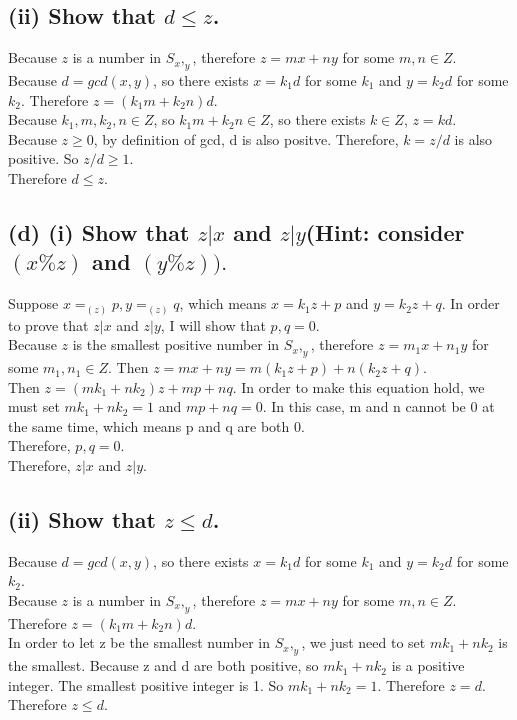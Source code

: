 \documentclass[]{article}
\begin{document}
\begin{spacing}{1.5}
\subsection*{(ii) Show that $ d  \leq z $. }
Because $ z $ is a number in $ S_{x},_{y} $, therefore $ z = mx+ny $ for some $ m,n \in Z $. \\
Because $ d = gcd(x, y) $, so there exists $ x = k_1d $ for some $ k_1 $ and $ y = k_2d $ for some $ k_2 $. Therefore $ z = (k_1m + k_2n)d $.\\
Because $ k_1, m, k_2, n \in Z$, so $ k_1m + k_2n  \in Z$, so there exists $ k \in Z $, $ z = kd $.\\
Because $ z \geq 0 $, by definition of gcd, d is also positve. Therefore, $ k = z/d $ is also positive. So $ z/d \geq 1 $.\\
Therefore $d \leq z$.

\subsection*{(d) (i) Show that $ z | x $ and  $z | y$(Hint: consider $(x \% z) $ and  $(y  \% z)). $}
Suppose $ x = _{(z)}p, y = _{(z)}q $, which means $ x = k_1z + p $ and $  y = k_2z + q $. In order to prove that $ z | x $ and  $z | y$,  I will show that $ p, q = 0 $.\\
Because $ z $ is the smallest positive number in $ S_{x},_{y} $, therefore $ z = m_1x+n_1y $ for some $ m_1,n_1 \in Z $. Then $ z = mx+ny = m(k_1z + p) + n(k_2z + q)$.\\
Then $ z = (mk_1 + nk_2)z + mp + nq $. In order to make this equation hold, we must set $ mk_1 + nk_2 = 1 $ and $ mp + nq  = 0 $. In this case, m and n cannot be 0 at the same time, which means p and q are both 0.\\
Therefore, $ p, q = 0 $.\\
Therefore, $ z | x $ and  $z | y$.

\subsection*{(ii) Show that $ z  \leq d $.}
Because $ d = gcd(x, y) $, so there exists $ x = k_1d $ for some $ k_1 $ and $ y = k_2d $ for some $ k_2 $.\\ 
Because $ z $ is a number in $ S_{x},_{y} $, therefore $ z = mx+ny $ for some $ m,n \in Z $. \\
Therefore $ z = (k_1m + k_2n)d $.\\
In order to let z be the smallest number in $ S_{x},_{y} $, we just need to set $ mk_1 + nk_2 $ is the smallest. Because z and d are both positive, so $ mk_1 + nk_2 $ is a positive integer. The smallest positive integer is 1. So $ mk_1 + nk_2 = 1$. Therefore $ z = d $.\\
Therefore $ z  \leq d $.


\end{spacing}
\end{document}
